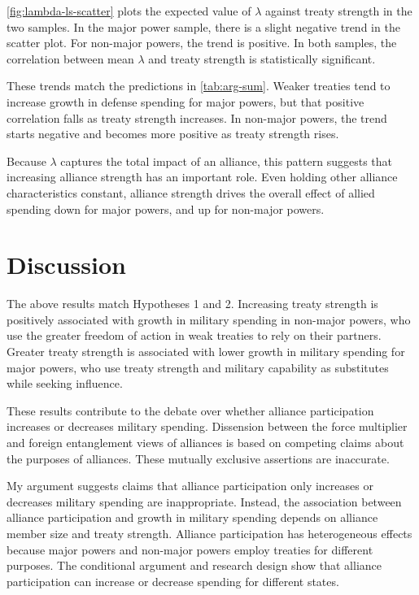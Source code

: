 \documentclass[12pt]{article}
\begin{document}
\autoref{fig:lambda-ls-scatter} plots the expected value of $\lambda$ against treaty strength in the two samples. 
In the major power sample, there is a slight negative trend in the scatter plot.
For non-major powers, the trend is positive.
In both samples, the correlation between mean $\lambda$ and treaty strength is statistically significant. 


These trends match the predictions in \autoref{tab:arg-sum}.  
Weaker treaties tend to increase growth in defense spending for major powers, but that positive correlation falls as treaty strength increases. 
In non-major powers, the trend starts negative and becomes more positive as treaty strength rises. 


Because $\lambda$ captures the total impact of an alliance, this pattern suggests that increasing alliance strength has an important role. 
Even holding other alliance characteristics constant, alliance strength drives the overall effect of allied spending down for major powers, and up for non-major powers. 


\section{Discussion}


The above results match Hypotheses 1 and 2. 
Increasing treaty strength is positively associated with growth in military spending in non-major powers, who use the greater freedom of action in weak treaties to rely on their partners. 
Greater treaty strength is associated with lower growth in military spending for major powers, who use treaty strength and military capability as substitutes while seeking influence. 


These results contribute to the debate over whether alliance participation increases or decreases military spending. 
Dissension between the force multiplier and foreign entanglement views of alliances is based on competing claims about the purposes of alliances. 
These mutually exclusive assertions are inaccurate. 


My argument suggests claims that alliance participation only increases or decreases military spending are inappropriate. 
Instead, the association between alliance participation and growth in military spending depends on alliance member size and treaty strength. 
Alliance participation has heterogeneous effects because major powers and non-major powers employ treaties for different purposes. 
The conditional argument and research design show that alliance participation can increase or decrease spending for different states. 
\end{document}
